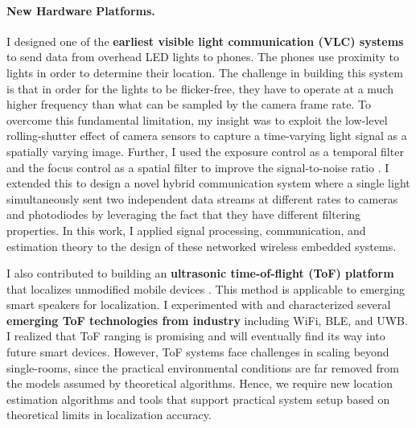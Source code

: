 \documentclass[10pt]{article}
\begin{document}
\paragraph{New Hardware Platforms. }

I designed one of the \textbf{earliest visible light communication (VLC) systems} to send data from overhead LED lights to phones. The phones use proximity to lights in order to determine their location.  The challenge in building this system is that in order for the lights to be flicker-free, they have to operate at a much higher frequency than what can be sampled by the camera frame rate. 
To overcome this fundamental limitation, my insight was to exploit the low-level rolling-shutter effect of camera sensors to capture a time-varying light signal as a spatially varying image. Further, I used the exposure control as a temporal filter and the focus control as a spatial filter to improve the signal-to-noise ratio \cite{rajagopal2014visual, rajagopal2014demonstration}. %
I extended this to design a novel hybrid communication system where a single light simultaneously sent two independent data streams at different rates to cameras and photodiodes \cite{rajagopal2014hybrid} by leveraging the fact that they have different filtering  properties. %
In this work, I applied signal processing, communication, and estimation theory to the design of these networked wireless embedded systems.

I also contributed to building an \textbf{ultrasonic time-of-flight (ToF) platform} that localizes unmodified mobile devices \cite{rtas-alps-platform, lazik2015alps,lazik2015alpsdemo}. This method is applicable to emerging smart speakers for localization. I experimented with and characterized several \textbf{emerging ToF technologies from industry} including WiFi, BLE, and UWB. %
I realized that ToF ranging is promising and will eventually find its way into future smart devices.  However, ToF systems face challenges in scaling beyond single-rooms, since the practical environmental conditions are far removed from the models assumed by theoretical algorithms. Hence, we require new location estimation algorithms and tools that support practical system setup based on theoretical limits in localization accuracy. %
\end{document}
